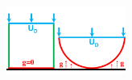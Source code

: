 \documentclass[8pt, oneside]{beamer}   	%
\begin{document}
\begin{frame}
\begin{figure}[htbp!]
	\includegraphics[width=0.35\textwidth]{img/squarecircle.pdf}
		\label{abb_arc}
\end{figure}
\end{frame}


\end{document}
